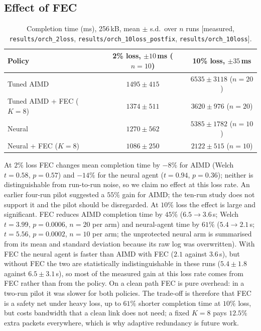 \subsection{Effect of FEC}
\begin{table}[t]\centering\small
\caption{Completion time (ms), 256\,kB, mean $\pm$ s.d.\ over $n$ runs [measured, \texttt{results/orch\_2loss}, \texttt{results/orch\_10loss\_postfix}, \texttt{results/orch\_10loss}].}
\label{tab:fec}
\begin{tabular}{lcc}\toprule
Policy & 2\% loss, $\pm10$\,ms ($n{=}10$) & 10\% loss, $\pm35$\,ms\\\midrule
Tuned AIMD & $1495\pm415$ & $6535\pm3118$ ($n{=}20$)\\
Tuned AIMD + FEC ($K{=}8$) & $1374\pm511$ & $3620\pm976$ ($n{=}20$)\\
Neural & $1270\pm562$ & $5385\pm1782$ ($n{=}10$)\\
Neural + FEC ($K{=}8$) & $1086\pm250$ & $2122\pm515$ ($n{=}10$)\\\bottomrule
\end{tabular}
\end{table}
At $2\%$ loss FEC changes mean completion time by $-8\%$ for AIMD (Welch $t=0.58$, $p=0.57$) and $-14\%$ for the neural agent ($t=0.94$, $p=0.36$); neither is distinguishable from run-to-run noise, so we claim no effect at this loss rate. An earlier four-run pilot suggested a $55\%$ gain for AIMD; the ten-run study does not support it and the pilot should be disregarded.
At $10\%$ loss the effect is large and significant. FEC reduces AIMD completion time by $45\%$ ($6.5\to3.6$\,s; Welch $t=3.99$, $p=0.0006$, $n=20$ per arm) and neural-agent time by $61\%$ ($5.4\to2.1$\,s; $t=5.56$, $p=0.0002$, $n=10$ per arm; the unprotected neural arm is summarised from its mean and standard deviation because its raw log was overwritten). With FEC the neural agent is faster than AIMD with FEC ($2.1$ against $3.6$\,s), but without FEC the two are statistically indistinguishable in these runs ($5.4\pm1.8$ against $6.5\pm3.1$\,s), so most of the measured gain at this loss rate comes from FEC rather than from the policy.
On a clean path FEC is pure overhead: in a two-run pilot it was slower for both policies. The trade-off is therefore that FEC is a safety net under heavy loss, up to $61\%$ shorter completion time at $10\%$ loss, but costs bandwidth that a clean link does not need; a fixed $K{=}8$ pays $12.5\%$ extra packets everywhere, which is why adaptive redundancy is future work.

